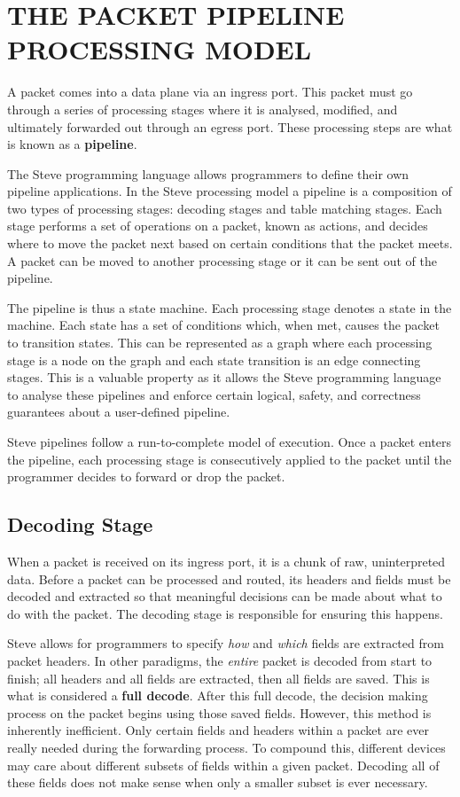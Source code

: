 \chapter{THE PACKET PIPELINE PROCESSING MODEL} \label{ch:pipeline_model}

A packet comes into a data plane via an ingress port. This packet must go through a series of processing stages where it is analysed, modified, and ultimately forwarded out through an egress port. These processing steps are what is known as a \textbf{pipeline}.

The Steve programming language allows programmers to define their own pipeline applications. In the Steve processing model a pipeline is a composition of two types of processing stages: decoding stages and table matching stages. Each stage performs a set of operations on a packet, known as actions, and decides where to move the packet next based on certain conditions that the packet meets. A packet can be moved to another processing stage or it can be sent out of the pipeline.

The pipeline is thus a state machine. Each processing stage denotes a state in the machine. Each state has a set of conditions which, when met, causes the packet to transition states. This can be represented as a graph where each processing stage is a node on the graph and each state transition is an edge connecting stages. This is a valuable property as it allows the Steve programming language to analyse these pipelines and enforce certain logical, safety, and correctness guarantees about a user-defined pipeline.

Steve pipelines follow a run-to-complete model of execution. Once a packet enters the pipeline, each processing stage is consecutively applied to the packet until the programmer decides to forward or drop the packet.

\section{Decoding Stage} \label{decoder_desc}

When a packet is received on its ingress port, it is a chunk of raw, uninterpreted data. Before a packet can be processed and routed, its headers and fields must be decoded and extracted so that meaningful decisions can be made about what to do with the packet. The decoding stage is responsible for ensuring this happens.

Steve allows for programmers to specify \textit{how} and \textit{which} fields are extracted from packet headers. In other paradigms, the \textit{entire} packet is decoded from start to finish; all headers and all fields are extracted, then all fields are saved. This is what is considered a \textbf{full decode}. After this full decode, the decision making process on the packet begins using those saved fields. However, this method is inherently inefficient. Only certain fields and headers within a packet are ever really needed during the forwarding process. To compound this, different devices may care about different subsets of fields within a given packet. Decoding all of these fields does not make sense when only a smaller subset is ever necessary.

